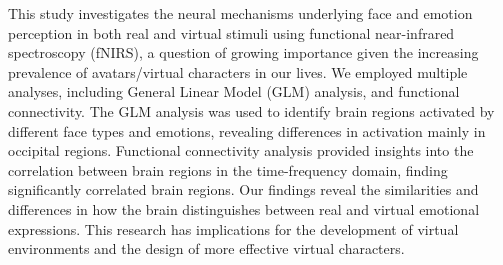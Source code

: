 This study investigates the neural mechanisms underlying face and emotion perception in both real and virtual stimuli using functional near-infrared spectroscopy (fNIRS), a question of growing importance given the increasing prevalence of avatars/virtual characters in our lives. 
We employed multiple analyses, including General Linear Model (GLM) analysis, and functional connectivity. 
The GLM analysis was used to identify brain regions activated by different face types and emotions, revealing differences in activation mainly in occipital regions. 
Functional connectivity analysis provided insights into the correlation between brain regions in the time-frequency domain, finding significantly correlated brain regions. 
Our findings reveal the similarities and differences in how the brain distinguishes between real and virtual emotional expressions. 
This research has implications for the development of virtual environments and the design of more effective virtual characters.